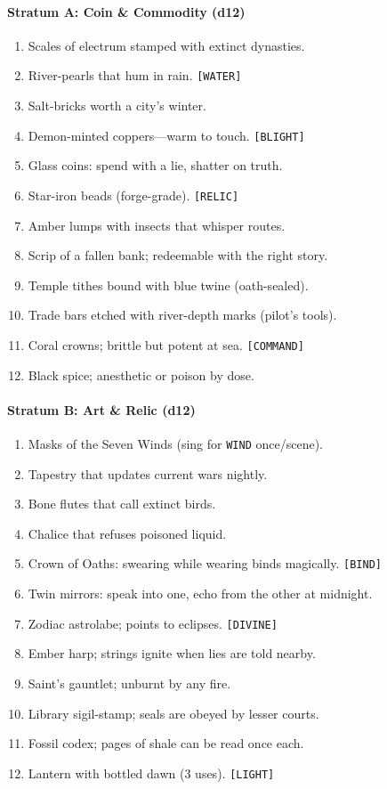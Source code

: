 \paragraph{Stratum A: Coin \& Commodity (d12)}
\begin{enumerate}
    \item Scales of electrum stamped with extinct dynasties.
    \item River-pearls that hum in rain. \texttt{[WATER]}
    \item Salt-bricks worth a city's winter.
    \item Demon-minted coppers---warm to touch. \texttt{[BLIGHT]}
    \item Glass coins: spend with a lie, shatter on truth.
    \item Star-iron beads (forge-grade). \texttt{[RELIC]}
    \item Amber lumps with insects that whisper routes.
    \item Scrip of a fallen bank; redeemable with the right story.
    \item Temple tithes bound with blue twine (oath-sealed).
    \item Trade bars etched with river-depth marks (pilot's tools).
    \item Coral crowns; brittle but potent at sea. \texttt{[COMMAND]}
    \item Black spice; anesthetic or poison by dose.
\end{enumerate}

\paragraph{Stratum B: Art \& Relic (d12)}
\begin{enumerate}
    \item Masks of the Seven Winds (sing for \texttt{WIND} once/scene).
    \item Tapestry that updates current wars nightly.
    \item Bone flutes that call extinct birds.
    \item Chalice that refuses poisoned liquid.
    \item Crown of Oaths: swearing while wearing binds magically. \texttt{[BIND]}
    \item Twin mirrors: speak into one, echo from the other at midnight.
    \item Zodiac astrolabe; points to eclipses. \texttt{[DIVINE]}
    \item Ember harp; strings ignite when lies are told nearby.
    \item Saint's gauntlet; unburnt by any fire.
    \item Library sigil-stamp; seals are obeyed by lesser courts.
    \item Fossil codex; pages of shale can be read once each.
    \item Lantern with bottled dawn (3 uses). \texttt{[LIGHT]}
\end{enumerate}

